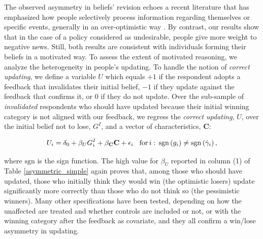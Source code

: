 \documentclass[11pt]{article}
\begin{document}
The observed asymmetry in beliefs' revision echoes a recent literature that has emphasized how people selectively process information regarding themselves or specific events, generally in an over-optimistic way \citep[][]{eil_good_2011,mobius_et_al_2011,sharot_et_al_2011}. By contrast, our results show that in the case of a policy considered as undesirable, people give more weight to negative news. Still, both results are consistent with individuals forming their beliefs in a motivated way. To assess the extent of motivated reasoning, we analyze the heterogeneity in people's updating. To handle the notion of \textit{correct updating}, we define a variable $U$ which equals $+1$ if the respondent adopts a feedback that invalidates their initial belief, $-1$ if they update against the feedback that confirms it, or $0$ if they do not update. Over the sub-sample of \textit{invalidated} respondents who should have updated because their initial winning category is not aligned with our feedback, we regress the \textit{correct updating}, $U$, over the initial belief not to lose, $G^I$, and a vector of characteristics, \textbf{C}:

\begin{equation}
	U_{i} = \delta_{0}+\beta_{U}G^I_{i}+\mathbf{\beta_C C}+\epsilon_{i}\hspace{0.3cm} \text{for}\,i:\,\text{sgn}\left(g_i\right)\neq\text{sgn}\left(\hat{\gamma}_i\right),
\end{equation}

\noindent
where $\text{sgn}$ is the sign function. The high value for $\beta_{U}$ reported in column (1) of Table \ref{asymmetric_simple} again proves that, among those who should have updated, those who initially think they would win (the optimistic losers) update significantly more correctly than those who do not think so (the pessimistic winners). Many other specifications have been tested, depending on how the unaffected are treated and whether controls are included or not, or with the winning category after the feedback as covariate, and they all confirm a win/lose asymmetry in updating.

\end{document}
